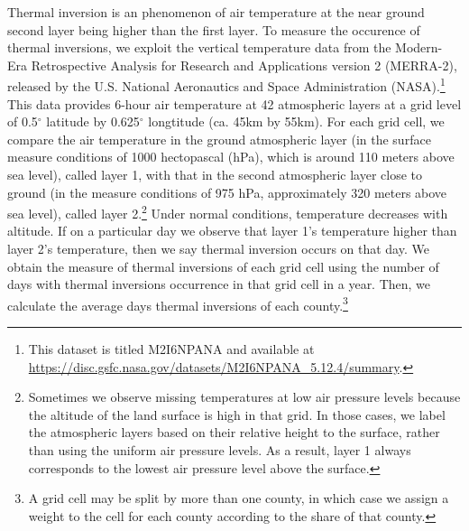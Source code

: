 \documentclass[12pt]{article}
\begin{document}
\label{sec:data_TI} Thermal inversion is an phenomenon of air temperature at
the near ground second layer being higher than the first layer. To measure
the occurence of thermal inversions, we exploit the vertical temperature
data from the Modern-Era Retrospective Analysis for Research and
Applications version 2 (MERRA-2), released by the U.S. National Aeronautics and Space Administration (NASA).\footnote{This dataset is titled M2I6NPANA and available at \url{https://disc.gsfc.nasa.gov/datasets/M2I6NPANA_5.12.4/summary}.} This
data provides 6-hour air temperature at 42 atmospheric layers at a grid
level of 0.5${{}^\circ}$ latitude
by 0.625${{}^\circ}$ longtitude
(ca. 45km by 55km). For each grid cell, we compare
the air temperature in the ground atmospheric layer (in the surface measure
conditions of 1000 hectopascal (hPa), which is around 110
meters above sea level), called layer 1, with that in the second atmospheric
layer close to ground (in the measure conditions of 975 hPa, approximately
320 meters above sea level), called layer 2.\footnote{%
Sometimes we observe missing temperatures at low air pressure levels because
the altitude of the land surface is high in that grid. In those cases, we
label the atmospheric layers based on their relative height to the surface,
rather than using the uniform air pressure levels. As a result, layer 1
always corresponds to the lowest air pressure level above the surface.}
Under normal conditions, temperature decreases with altitude. If on a
particular day we observe that layer 1's temperature higher than layer 2's
temperature, then we say thermal inversion occurs on that day. We obtain
the measure of thermal inversions of each grid cell using the number of days
with thermal inversions occurrence in that grid cell in a year. Then, we calculate the average days thermal inversions of each county.\footnote{A grid cell may be split by more than one county, in which case we assign a weight to the cell for each county according to the share of that county.} 
\end{document}
